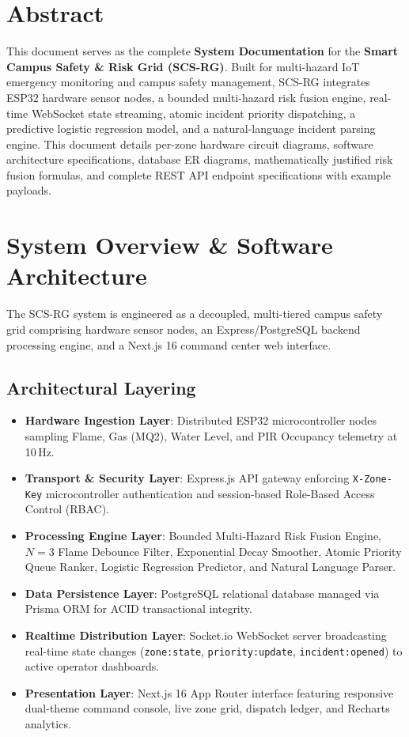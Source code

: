 \documentclass[11pt,a4paper]{article}
\begin{document}
\thispagestyle{empty}
\newpage

\thispagestyle{plain}
\tableofcontents
\newpage
\section*{Abstract}\large
This document serves as the complete \textbf{System Documentation} for the \textbf{Smart Campus Safety \& Risk Grid (SCS-RG)}. Built for multi-hazard IoT emergency monitoring and campus safety management, SCS-RG integrates ESP32 hardware sensor nodes, a bounded multi-hazard risk fusion engine, real-time WebSocket state streaming, atomic incident priority dispatching, a predictive logistic regression model, and a natural-language incident parsing engine. This document details per-zone hardware circuit diagrams, software architecture specifications, database ER diagrams, mathematically justified risk fusion formulas, and complete REST API endpoint specifications with example payloads.
\normalsize
\newpage

\section{System Overview \& Software Architecture}

The SCS-RG system is engineered as a decoupled, multi-tiered campus safety grid comprising hardware sensor nodes, an Express/PostgreSQL backend processing engine, and a Next.js 16 command center web interface.

\subsection{Architectural Layering}
\begin{itemize}[leftmargin=*]
    \item \textbf{Hardware Ingestion Layer}: Distributed ESP32 microcontroller nodes sampling Flame, Gas (MQ2), Water Level, and PIR Occupancy telemetry at 10\,Hz.
    \item \textbf{Transport \& Security Layer}: Express.js API gateway enforcing \texttt{X-Zone-Key} microcontroller authentication and session-based Role-Based Access Control (RBAC).
    \item \textbf{Processing Engine Layer}: Bounded Multi-Hazard Risk Fusion Engine, $N=3$ Flame Debounce Filter, Exponential Decay Smoother, Atomic Priority Queue Ranker, Logistic Regression Predictor, and Natural Language Parser.
    \item \textbf{Data Persistence Layer}: PostgreSQL relational database managed via Prisma ORM for ACID transactional integrity.
    \item \textbf{Realtime Distribution Layer}: Socket.io WebSocket server broadcasting real-time state changes (\texttt{zone:state}, \texttt{priority:update}, \texttt{incident:opened}) to active operator dashboards.
    \item \textbf{Presentation Layer}: Next.js 16 App Router interface featuring responsive dual-theme command console, live zone grid, dispatch ledger, and Recharts analytics.
\end{itemize}
\end{document}
